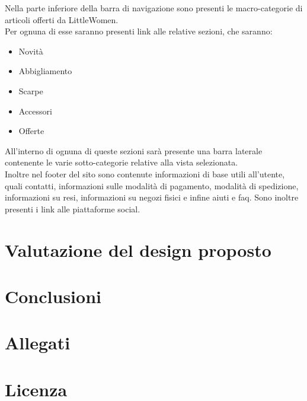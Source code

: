 \documentclass[12pt,a4paper]{report}
\begin{document}
Nella parte inferiore della barra di navigazione sono presenti le macro-categorie di articoli offerti da LittleWomen.\\ Per ognuna di esse saranno presenti link alle relative sezioni, che saranno:
\begin{itemize}
  \item Novità
  \item Abbigliamento
  \item Scarpe
  \item Accessori
  \item Offerte
\end{itemize}
All'interno di ognuna di queste sezioni sarà presente una barra laterale contenente le varie sotto-categorie relative alla vista selezionata. \\
Inoltre nel footer del sito sono contenute informazioni di base utili all'utente, quali contatti, informazioni sulle modalità di pagamento, modalità di spedizione, informazioni su resi, informazioni su negozi fisici e infine aiuti e faq. Sono inoltre presenti i link alle piattaforme social.
\chapter{Valutazione del design proposto}
\chapter{Conclusioni}
\chapter{Allegati}
\chapter{Licenza}
\end{document}
